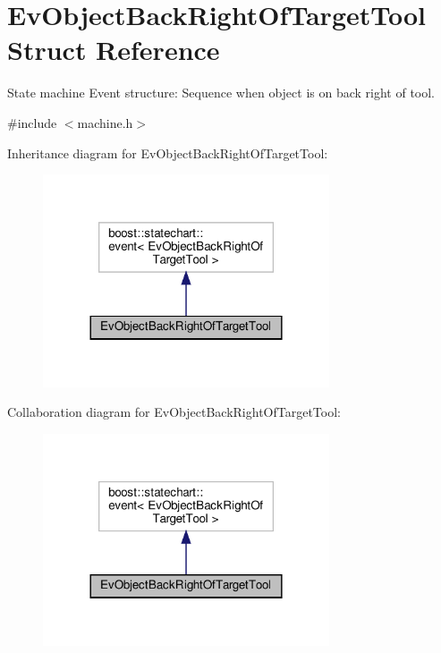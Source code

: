 \hypertarget{structEvObjectBackRightOfTargetTool}{}\section{Ev\+Object\+Back\+Right\+Of\+Target\+Tool Struct Reference}
\label{structEvObjectBackRightOfTargetTool}


State machine Event structure\+: Sequence when object is on back right of tool.  




{\ttfamily \#include $<$machine.\+h$>$}



Inheritance diagram for Ev\+Object\+Back\+Right\+Of\+Target\+Tool\+:
\nopagebreak
\begin{figure}[H]
\begin{center}
\leavevmode
\includegraphics[width=240pt]{structEvObjectBackRightOfTargetTool__inherit__graph}
\end{center}
\end{figure}


Collaboration diagram for Ev\+Object\+Back\+Right\+Of\+Target\+Tool\+:
\nopagebreak
\begin{figure}[H]
\begin{center}
\leavevmode
\includegraphics[width=240pt]{structEvObjectBackRightOfTargetTool__coll__graph}
\end{center}
\end{figure}


